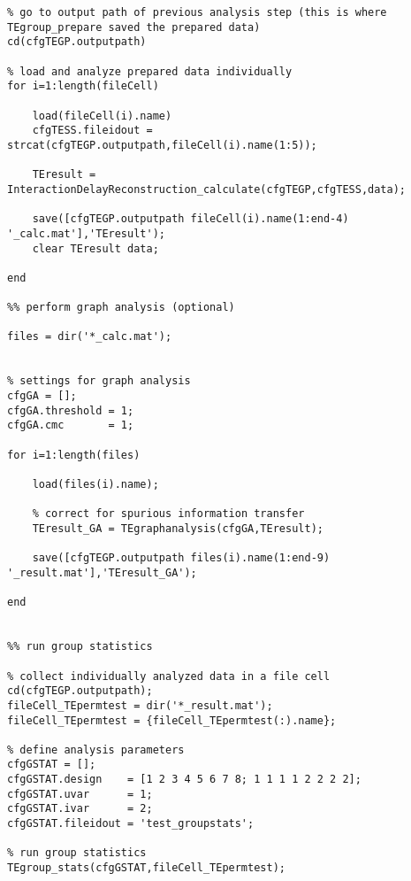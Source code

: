 \begin{lstlisting}
% go to output path of previous analysis step (this is where TEgroup_prepare saved the prepared data)
cd(cfgTEGP.outputpath)

% load and analyze prepared data individually
for i=1:length(fileCell)
        
    load(fileCell(i).name)
    cfgTESS.fileidout = strcat(cfgTEGP.outputpath,fileCell(i).name(1:5));
    
    TEresult = InteractionDelayReconstruction_calculate(cfgTEGP,cfgTESS,data);
    
    save([cfgTEGP.outputpath fileCell(i).name(1:end-4) '_calc.mat'],'TEresult');
    clear TEresult data;
    
end

%% perform graph analysis (optional)

files = dir('*_calc.mat');


% settings for graph analysis
cfgGA = [];
cfgGA.threshold = 1;
cfgGA.cmc       = 1;

for i=1:length(files)
    
    load(files(i).name);
    
    % correct for spurious information transfer
    TEresult_GA = TEgraphanalysis(cfgGA,TEresult);
    
    save([cfgTEGP.outputpath files(i).name(1:end-9) '_result.mat'],'TEresult_GA');
    
end


%% run group statistics

% collect individually analyzed data in a file cell
cd(cfgTEGP.outputpath);
fileCell_TEpermtest = dir('*_result.mat');
fileCell_TEpermtest = {fileCell_TEpermtest(:).name};

% define analysis parameters
cfgGSTAT = [];
cfgGSTAT.design    = [1 2 3 4 5 6 7 8; 1 1 1 1 2 2 2 2];
cfgGSTAT.uvar      = 1;
cfgGSTAT.ivar      = 2;
cfgGSTAT.fileidout = 'test_groupstats';

% run group statistics
TEgroup_stats(cfgGSTAT,fileCell_TEpermtest);
\end{lstlisting}